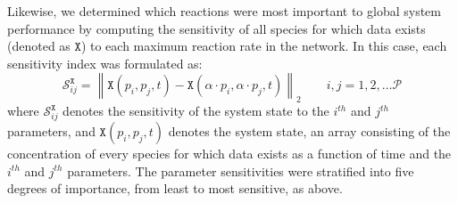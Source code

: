 \documentclass[12pt]{article}
\newcommand{\norm}[1]{\left\lVert#1\right\rVert}
\begin{document}
Likewise, we determined which reactions were most important to global system performance by computing the sensitivity of all species for which data exists (denoted as $\texttt{X}$)
to each maximum reaction rate in the network.
In this case, each sensitivity index was formulated as:
\begin{equation}\label{eqn:system-sensitivity}
    \mathcal{S}_{ij}^{\texttt{X}}=\norm{\texttt{X}(p_i,p_j,t)-\texttt{X}(\alpha \cdot p_i,\alpha \cdot p_j,t)}_{2}\qquad{i,j=1,2,\hdots\mathcal{P}}
\end{equation}
where $\mathcal{S}_{ij}^{\texttt{X}}$ denotes the sensitivity of the system state to the $i^{th}$ and $j^{th}$ parameters,
and $\texttt{X}(p_i,p_j,t)$ denotes the system state, an array consisting of the concentration of every species for
which data exists as a function of time and the $i^{th}$ and $j^{th}$ parameters.
The parameter sensitivities were stratified into five degrees of importance, from least to most sensitive, as above.

\end{document}
